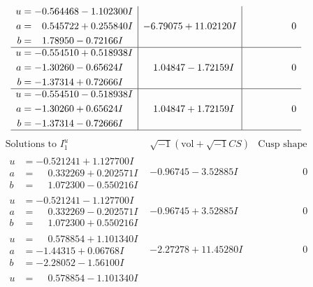 \documentclass[1p]{elsarticle_modified}
\theoremstyle{definition}
\newcommand{\I}{\sqrt{-1}}
\begin{document}
$$\begin{array}{c|c|c}
\begin{aligned}
u &= -0.564468 - 1.102300 I \\
a &= \phantom{-}0.545722 + 0.255840 I \\
b &= \phantom{-}1.78950 - 0.72166 I\end{aligned}
 & -6.79075 + 11.02120 I & \phantom{-0.000000 } 0 \\ \hline\begin{aligned}
u &= -0.554510 + 0.518938 I \\
a &= -1.30260 - 0.65624 I \\
b &= -1.37314 + 0.72666 I\end{aligned}
 & \phantom{-}1.04847 - 1.72159 I & \phantom{-0.000000 } 0 \\ \hline\begin{aligned}
u &= -0.554510 - 0.518938 I \\
a &= -1.30260 + 0.65624 I \\
b &= -1.37314 - 0.72666 I\end{aligned}
 & \phantom{-}1.04847 + 1.72159 I & \phantom{-0.000000 } 0\\
 \hline 
 \end{array}$$\newpage$$\begin{array}{c|c|c}  
\text{Solutions to }I^u_{1}& \I (\text{vol} + \sqrt{-1}CS) & \text{Cusp shape}\\
 \hline 
\begin{aligned}
u &= -0.521241 + 1.127700 I \\
a &= \phantom{-}0.332269 + 0.202571 I \\
b &= \phantom{-}1.072300 - 0.550216 I\end{aligned}
 & -0.96745 - 3.52885 I & \phantom{-0.000000 } 0 \\ \hline\begin{aligned}
u &= -0.521241 - 1.127700 I \\
a &= \phantom{-}0.332269 - 0.202571 I \\
b &= \phantom{-}1.072300 + 0.550216 I\end{aligned}
 & -0.96745 + 3.52885 I & \phantom{-0.000000 } 0 \\ \hline\begin{aligned}
u &= \phantom{-}0.578854 + 1.101340 I \\
a &= -1.44315 + 0.06768 I \\
b &= -2.28052 - 1.56100 I\end{aligned}
 & -2.27278 + 11.45280 I & \phantom{-0.000000 } 0 \\ \hline\begin{aligned}
u &= \phantom{-}0.578854 - 1.101340 I \\

\end{aligned}
\end{array}$$
\end{document}

